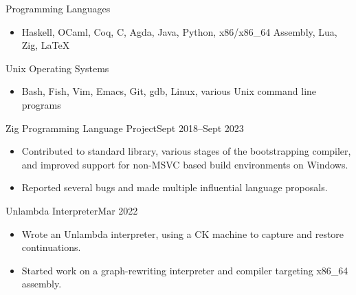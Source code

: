 \documentclass[a4paper,10pt]{article}
\begin{document}
    \begin{skill}{Programming Languages}
      \begin{itemize}[nosep]
        \item Haskell, OCaml, Coq, C, Agda, Java, Python, x86/x86\_64 Assembly, Lua, Zig, \LaTeX{}
      \end{itemize}
    \end{skill}

    \begin{skill}{Unix Operating Systems}
      \begin{itemize}[nosep]
        \item Bash, Fish, Vim, Emacs, Git, gdb, Linux, various Unix command line programs
     \end{itemize}
    \end{skill}

    \begin{activity}{Zig Programming Language Project}{Sept 2018--Sept 2023}
      \begin{itemize}[topsep=5pt, partopsep=0pt, itemsep=-1pt]
        \item Contributed to standard library, various stages of the bootstrapping compiler, and improved support for non-MSVC based build environments on Windows.
        \item Reported several bugs and made multiple influential language proposals.
      \end{itemize}
    \end{activity}


    \begin{activity}{Unlambda Interpreter}{Mar 2022}
      \begin{itemize}[topsep=5pt, partopsep=0pt, itemsep=-1pt]
        \item Wrote an Unlambda interpreter, using a CK machine to capture and restore continuations.
        \item Started work on a graph-rewriting interpreter and compiler targeting x86\_64 assembly.
      \end{itemize}
    \end{activity}
\end{document}
